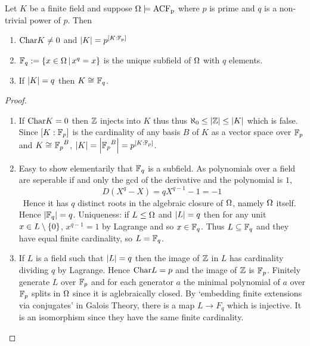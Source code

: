 \begin{prop}
    Let $K$ be a finite field and 
    suppose $\Omega \models \mathrm{ACF_p}$ where $p$ is prime
    and $q$ is a non-trivial power of $p$.
    Then 
    \begin{enumerate}
        \item $\mathrm{Char}K \ne 0$ and $\left\vert K \right\vert = p^{[K : \mathbb{F}_p]}$
        \item $\mathbb{F}_q := \left\{x \in \Omega \,|\, x^{q} = x\right\}$ is the unique 
            subfield of $\Omega$ with $q$ elements.
        \item If $\left\vert K \right\vert = q$ then $K \cong_{} \mathbb{F}_q$.
    \end{enumerate}
\end{prop}
\begin{proof}~
    \begin{enumerate}
        \item If $\mathrm{Char}K = 0$ then $\mathbb{Z}$ injects into $K$ thus 
            thus $\aleph_0 \le \left\vert \mathbb{Z} \right\vert \le \left\vert K \right\vert$ which is false.
            Since $[K : \mathbb{F}_p]$ is the cardinality of any basis $B$ of $K$
            as a vector space over $\mathbb{F}_p$ and $K \cong_{} {\mathbb{F}_p}^B$,
            $\left\vert K \right\vert = \left\vert {\mathbb{F}_p}^B \right\vert = p^{[K : \mathbb{F}_p]}$.
        \item Easy to show elementarily that $\mathbb{F}_q$ is a subfield.
            As polynomials over a field are seperable if and only
            the gcd of the derivative and the polynomial is $1$, 
            \[ D(X^q - X) = q X^{q - 1} - 1 = - 1 \]\
            Hence it has $q$ distinct roots in the algebraic closure of $\Omega$,
            namely $\Omega$ itself. 
            Hence $\left\vert \mathbb{F}_q \right\vert = q$.
            Uniqueness: if $L \le \Omega$ and $\left\vert L \right\vert = q$ 
            then for any unit $x \in L \setminus \left\{0\right\}$,
            $x^{q - 1} = 1$ by Lagrange and so $x \in \mathbb{F}_q$.
            Thus $L \subseteq \mathbb{F}_q$ and they have equal finite cardinality,
            so $L = \mathbb{F}_q$.
        \item If $L$ is a field such that $\left\vert L \right\vert = q$ then
             the image of $\mathbb{Z}$ in $L$ has cardinality dividing $q$
             by Lagrange.
             Hence $\mathrm{Char}L = p$ and the image of $\mathbb{Z}$ is $\mathbb{F}_p$.
             Finitely generate $L$ over $\mathbb{F}_p$
             and for each generator $a$ the minimal polynomial of $a$
             over $\mathbb{F}_p$ splits in $\Omega$ since it is aglebraically closed.
             By `embedding finite extensions via conjugates' in Galois Theory,
             there is a map $L \to F_q$ which is injective.
             It is an isomorphism since they have the same finite cardinality.
    \end{enumerate}
\end{proof}

